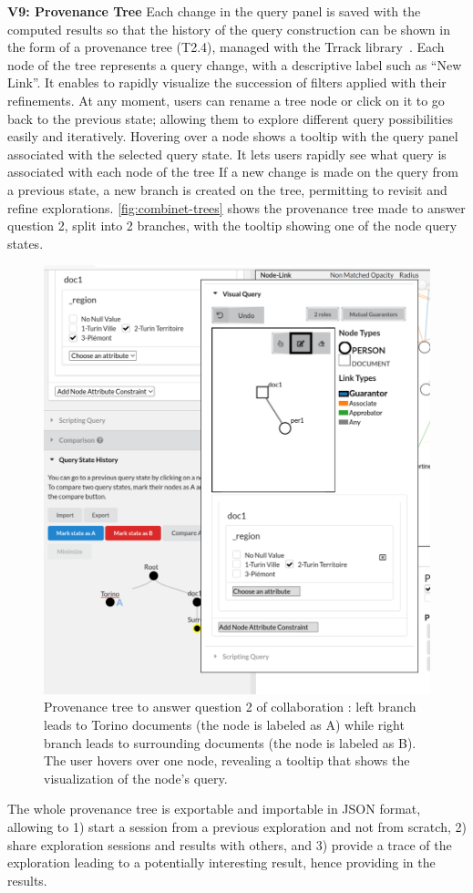 \noindent\textbf{V9: Provenance Tree}
Each change in the query panel is saved with the computed results so that the history of the query construction can be shown in the form of a provenance tree (T2.4), managed with the Trrack library~\cite{cutlerTrrackLibraryProvenanceTracking2020}.
Each node of the tree represents a query change, with a descriptive label such as ``New Link''.
It enables to rapidly visualize the succession of filters applied with their refinements.
At any moment, users can rename a tree node or click on it to go back to the previous state; allowing them to explore different query possibilities easily and iteratively.
Hovering over a node shows a tooltip with the query panel associated with the selected query state.
It lets users rapidly see what query is associated with each node of the tree
If a new change is made on the query from a previous state, a new branch is created on the tree, permitting to revisit and refine explorations.  \autoref{fig:combinet-trees} shows the provenance tree made to answer question 2, split into 2 branches, with the tooltip showing one of the node query states.
\begin{figure}[!ht]
     \centering
     \includegraphics[width=0.5\linewidth]{static/figures/ComBiNet/tree_tooltip_torinoquery_crop}
     \caption{Provenance tree to answer question 2 of collaboration \pascal: left branch leads to Torino documents (the node is labeled as A) while right branch leads to surrounding documents (the node is labeled as B). The user hovers over one node, revealing a tooltip that shows the visualization of the node's query.}\label{fig:combinet-trees}
 \end{figure}
The whole provenance tree is exportable and importable in JSON format, allowing to 1) start a session from a previous exploration and not from scratch, 2) share exploration sessions and results with others, and 3) provide a trace of the exploration leading to a potentially interesting result, hence providing \traceability in the results.


